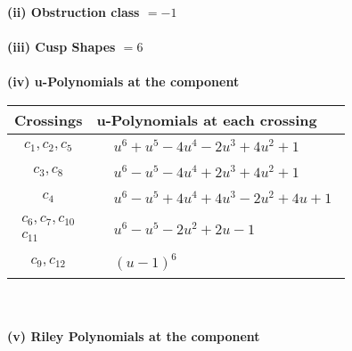 \documentclass[1p]{elsarticle_modified}
\theoremstyle{definition}
\begin{document}
\flushleft \textbf{(ii) Obstruction class $= -1$}\\~\\
\flushleft \textbf{(iii) Cusp Shapes $= 6$}\\~\\
\newpage\renewcommand{\arraystretch}{1}
\flushleft \textbf{(iv) u-Polynomials at the component}\newline \\
\begin{tabular}{m{50pt}|m{274pt}}
Crossings & \hspace{64pt}u-Polynomials at each crossing \\
\hline $$\begin{aligned}c_{1},c_{2},c_{5}\end{aligned}$$&$\begin{aligned}
&u^6+u^5-4 u^4-2 u^3+4 u^2+1
\end{aligned}$\\
\hline $$\begin{aligned}c_{3},c_{8}\end{aligned}$$&$\begin{aligned}
&u^6- u^5-4 u^4+2 u^3+4 u^2+1
\end{aligned}$\\
\hline $$\begin{aligned}c_{4}\end{aligned}$$&$\begin{aligned}
&u^6- u^5+4 u^4+4 u^3-2 u^2+4 u+1
\end{aligned}$\\
\hline $$\begin{aligned}c_{6},c_{7},c_{10}\\c_{11}\end{aligned}$$&$\begin{aligned}
&u^6- u^5-2 u^2+2 u-1
\end{aligned}$\\
\hline $$\begin{aligned}c_{9},c_{12}\end{aligned}$$&$\begin{aligned}
&(u-1)^6
\end{aligned}$\\
\hline
\end{tabular}\\~\\
\newpage\renewcommand{\arraystretch}{1}
\flushleft \textbf{(v) Riley Polynomials at the component}\newline \\
\end{document}
